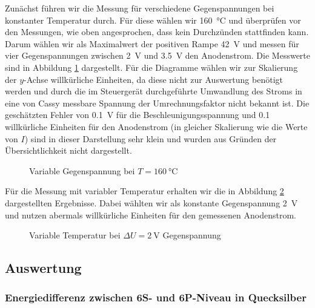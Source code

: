 \documentclass[11pt, a4paper]{article}
\begin{document}
Zunächst führen wir die Messung für verschiedene Gegenspannungen bei konstanter Temperatur durch.
Für diese wählen wir \SI{160}{\degreeCelsius} und überprüfen vor den Messungen, wie oben angesprochen, dass kein Durchzünden stattfinden kann.
Darum wählen wir als Maximalwert der positiven Rampe \SI{42}{\volt} und messen für vier Gegenspannungen zwischen \SI{2}{\volt} und \SI{3.5}{\volt} den Anodenstrom.
Die Messwerte sind in Abbildung \ref{fig:fh_varvolt} dargestellt.
Für die Diagramme wählen wir zur Skalierung der $y$-Achse willkürliche Einheiten, da diese nicht zur Auswertung benötigt werden und durch die im Steuergerät durchgeführte Umwandlung des Stroms in eine von Cassy messbare Spannung der Umrechnungsfaktor nicht bekannt ist.
Die geschätzten Fehler von \SI{0.1}{\volt} für die Beschleunigungsspannung und \num{0.1} willkürliche Einheiten für den Anodenstrom (in gleicher Skalierung wie die Werte von $I$) sind in dieser Darstellung sehr klein und wurden aus Gründen der Übersichtlichkeit nicht dargestellt.
\begin{figure}[!h]
\centering

\caption{Variable Gegenspannung bei $T=\SI{160}{\degreeCelsius}$}
\label{fig:fh_varvolt}
\end{figure}
Für die Messung mit variabler Temperatur erhalten wir die in Abbildung \ref{fig:fh_vartemp} dargestellten Ergebnisse.
Dabei wählten wir als konstante Gegenspannung \SI{2}{\volt} und nutzen abermals willkürliche Einheiten für den gemessenen Anodenstrom.
\begin{figure}[!h]
\centering

\caption{Variable Temperatur bei $\Delta U=\SI{2}{\volt}$ Gegenspannung}
\label{fig:fh_vartemp}
\end{figure}

\subsection{Auswertung}

\subsubsection{Energiedifferenz zwischen 6S- und 6P-Niveau in Quecksilber}
\end{document}
